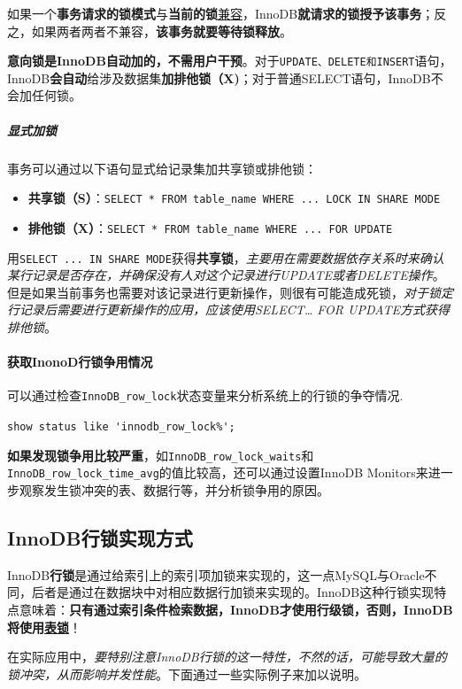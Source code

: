 \documentclass[UTF8,a4paper,12pt]{ctexbook}
\begin{document}
		  			如果一个\textbf{事务请求的锁模式}与\textbf{当前的锁}\underline{兼容}，InnoDB\textbf{就请求的锁授予该事务}；反之，如果两者两者不兼容，\textbf{该事务就要等待锁释放}。	
					
					\textbf{意向锁是InnoDB自动加的，不需用户干预}。对于\verb|UPDATE、DELETE和INSERT|语句，InnoDB\textbf{会自动}给涉及数据集\textbf{加排他锁（X)}；对于普通SELECT语句，InnoDB不会加任何锁。 
				
				\subparagraph{显式加锁}
					事务可以通过以下语句显式给记录集加共享锁或排他锁：
					\begin{itemize}[itemindent = 1em]
						\item \textbf{共享锁（S）}：\verb|SELECT * FROM table_name WHERE ... LOCK IN SHARE MODE|
						\item \textbf{排他锁（X）}：\verb|SELECT * FROM table_name WHERE ... FOR UPDATE|
					\end{itemize}
			
					用\verb|SELECT ... IN SHARE MODE|获得\textbf{共享锁}，\textit{主要用在需要数据依存关系时来确认某行记录是否存在，并确保没有人对这个记录进行UPDATE或者DELETE操作}。但是如果当前事务也需要对该记录进行更新操作，则很有可能造成死锁，\textit{对于锁定行记录后需要进行更新操作的应用，应该使用SELECT… FOR UPDATE方式获得排他锁}。
		
			\paragraph{获取InonoD行锁争用情况}
				可以通过检查\verb|InnoDB_row_lock|状态变量来分析系统上的行锁的争夺情况.
				
				\verb|show status like 'innodb_row_lock%';|
			
				\textbf{如果发现锁争用比较严重}，如\verb|InnoDB_row_lock_waits|和\verb|InnoDB_row_lock_time_avg|的值比较高，还可以通过设置InnoDB Monitors来进一步观察发生锁冲突的表、数据行等，并分析锁争用的原因。
			
		\subsection{InnoDB行锁实现方式}
			InnoDB\textbf{行锁}是通过给索引上的索引项加锁来实现的，这一点MySQL与Oracle不同，后者是通过在数据块中对相应数据行加锁来实现的。InnoDB这种行锁实现特点意味着：\textbf{只有通过索引条件检索数据，InnoDB才使用行级锁，否则，InnoDB将使用\underline{表锁}}！
			
			在实际应用中，\textit{要特别注意InnoDB行锁的这一特性，不然的话，可能导致大量的锁冲突，从而影响并发性能}。下面通过一些实际例子来加以说明。
			
\end{document}
